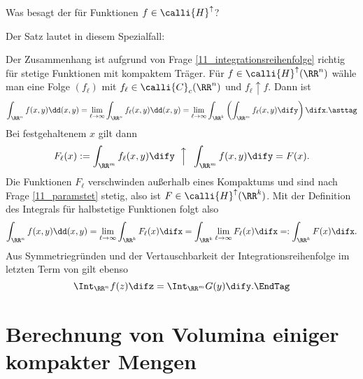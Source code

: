 \begin{frage}\label{11_kleinerfubini}
  Was besagt der  für Funktionen 
  $f\in\calli{H}^\uparrow$?
\end{frage}

\begin{antwort}
  Der Satz lautet in diesem Spezialfall:

  \medskip\noindent
  \noindent
  Der Zusammenhang ist aufgrund von Frage 
  \ref{11_integrationsreihenfolge} richtig für stetige 
  Funktionen mit kompaktem Träger. Für $f\in\calli{H}^\uparrow (\RR^{n})$ 
  wähle man eine Folge $(f_\ell)$ mit $f_\ell\in\calli{C}_c(\RR^{n})$ 
  und $f_\ell\uparrow f$. Dann ist 
  \[
  \int_{\RR^{n}} f(x,y)\dd (x,y) = 
  \lim_{\ell\to\infty} \int_{\RR^{n}} f_\ell(x,y)\dd (x,y) = 
  \lim_{\ell\to\infty} \int_{\RR^k} 
  \left(\int_{\RR^{m}} f_\ell(x,y)\dify \right)\difx. 
  \asttag
  \]
  Bei festgehaltenem $x$ gilt dann
  \[
  F_\ell(x):=\int_{\RR^m} f_\ell(x,y) \dify 
  \;\;\Big{\uparrow}\;\; \int_{\RR^m} f(x,y) \dify = F(x).  
  \]
  Die Funktionen $F_\ell$ verschwinden außerhalb eines Kompaktums und sind 
  nach Frage \ref{11_paramstet} stetig, also 
  ist $F\in\calli{H}^\uparrow (\RR^k)$. Mit der Definition des Integrals 
  für halbstetige Funktionen folgt also
  \[
  \int_{\RR^{n}} f(x,y) \dd (x,y) = 
  \lim_{\ell\to\infty} \int_{\RR^k} F_\ell(x) \difx = 
  \int_{\RR^k} \lim_{\ell\to\infty} F_\ell(x) \difx = :
  \int_{\RR^k} F(x) \difx.
  \]
  Aus Symmetriegründen und der Vertauschbarkeit der Integrationsreihenfolge 
  im letzten Term von {\astref} gilt ebenso 
  \[
  \Int_{\RR^{n}} f(z)\difz = \Int_{\RR^{m}} G(y) \dify. \EndTag
  \]
\end{antwort}




\section{Berechnung von Volumina einiger kompakter Mengen}


